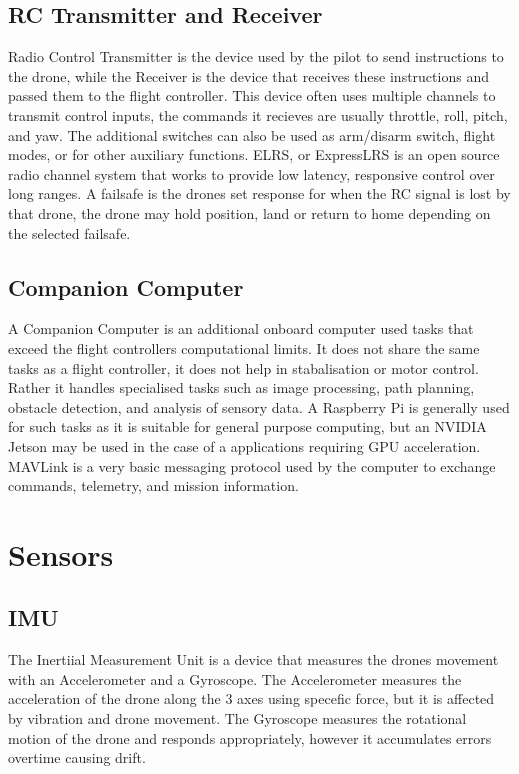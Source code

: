 \documentclass[conference]{IEEEtran}
\begin{document}
\subsection{RC Transmitter and Receiver}
Radio Control Transmitter is the device used by the pilot to send instructions to the drone, while the Receiver is the device that receives these instructions and passed them to the flight controller.
This device often uses multiple channels to transmit control inputs, the commands it recieves are usually throttle, roll, pitch, and yaw. The additional switches can also be used as arm/disarm switch, flight modes, or for other auxiliary functions.
ELRS, or ExpressLRS is an open source radio channel system that works to provide low latency, responsive control over long ranges.
A failsafe is the drones set response for when the RC signal is lost by that drone, the drone may hold position, land or return to home depending on the selected failsafe.

\subsection{Companion Computer}
A Companion Computer is an additional onboard computer used tasks that exceed the flight controllers computational limits.
It does not share the same tasks as a flight controller, it does not help in stabalisation or motor control. Rather it handles specialised tasks such as image processing, path planning, obstacle detection, and analysis of sensory data. A Raspberry Pi is generally used for such tasks as it is suitable for general purpose computing, but an NVIDIA Jetson may be used in the case of a applications requiring GPU acceleration.
MAVLink is a very basic messaging protocol used by the computer to exchange commands, telemetry, and mission information.

\section{Sensors}
\subsection{IMU}
The Inertiial Measurement Unit is a device that measures the drones movement with an Accelerometer and a Gyroscope. The Accelerometer measures the acceleration of the drone along the 3 axes using specefic force, but it is affected by vibration and drone movement. The Gyroscope measures the rotational motion of the drone and responds appropriately, however it accumulates errors overtime causing drift.
\end{document}
